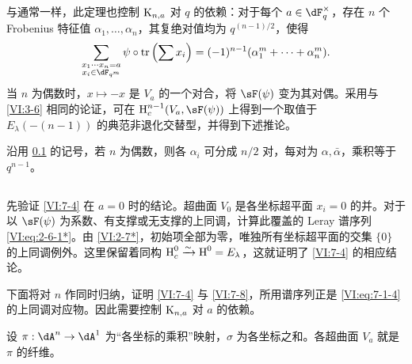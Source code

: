 \subsection{}\label{VI:7-5}
与通常一样，此定理也控制 $\textnormal{K}_{n,a}$ 对 $q$ 的依赖：对于每个 $a\in\dF_q^\times$，存在 $n$ 个 Frobenius 特征值 $\alpha_1,\ldots,\alpha_n$，其复绝对值均为 $q^{(n-1)/2}$，使得
\[
\sum_{\substack{x_1\cdots x_n=a\\x_i\in\dF_{q^m}}}
 \psi\circ\tr\left(\sum x_i\right)
=(-1)^{n-1}(\alpha_1^m+\cdots+\alpha_n^m).
\]
当 $n$ 为偶数时，$x\mapsto-x$ 是 $V_a$ 的一个对合，将 $\sF(\psi)$ 变为其对偶。采用与 \ref{VI:3-6} 相同的论证，可在 $\h_c^{n-1}(V_a,\sF(\psi))$ 上得到一个取值于 $E_\lambda(-(n-1))$ 的典范非退化交替型，并得到下述推论。

\begin{corollary_}\label{VI:7-6}
沿用 \ref{VI:7-5} 的记号，若 $n$ 为偶数，则各 $\alpha_i$ 可分成 $n/2$ 对，每对为 $\alpha,\bar\alpha$，乘积等于 $q^{n-1}$。
\end{corollary_}

\subsection{}\label{VI:7-7}
先验证 \ref{VI:7-4} 在 $a=0$ 时的结论。超曲面 $V_0$ 是各坐标超平面 $x_i=0$ 的并。对于以 $\sF(\psi)$ 为系数、有支撑或无支撑的上同调，计算此覆盖的 Leray 谱序列 \eqref{VI:eq:2-6-1*}。由 \ref{VI:2-7*}，初始项全部为零，唯独所有坐标超平面的交集 $\{0\}$ 的上同调例外。这里保留着同构 $\operatorname{H}_c^0\xrightarrow\sim\operatorname{H}^0=E_\lambda$，这就证明了 \ref{VI:7-4} 的相应结论。

下面将对 $n$ 作同时归纳，证明 \ref{VI:7-4} 与 \ref{VI:7-8}，所用谱序列正是 \eqref{VI:eq:7-1-4} 的上同调对应物。因此需要控制 $\textnormal{K}_{n,a}$ 对 $a$ 的依赖。

设 $\pi:\dA^n\to\dA^1$ 为“各坐标的乘积”映射，$\sigma$ 为各坐标之和。各超曲面 $V_a$ 就是 $\pi$ 的纤维。

